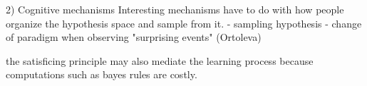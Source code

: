 2) Cognitive mechanisms 
Interesting mechanisms have to do with how people organize the hypothesis space and sample from it. 
- sampling hypothesis
- change of paradigm when observing "surprising events" (Ortoleva) \cite{ortoleva2012modeling}

the satisficing principle may also mediate the learning process because computations such as bayes rules are costly.